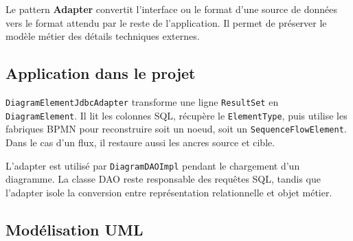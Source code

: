 \documentclass[12pt,a4paper]{article}
\newenvironment{umlfigure}
{\begin{center}\resizebox{0.90\textwidth}{!}\bgroup}
{\egroup\end{center}}
\begin{document}
Le pattern \textbf{Adapter} convertit l'interface ou le format d'une source de données vers le format attendu par le reste de l'application. Il permet de préserver le modèle métier des détails techniques externes.

\subsection{Application dans le projet}

\texttt{DiagramElementJdbcAdapter} transforme une ligne \texttt{ResultSet} en \texttt{DiagramElement}. Il lit les colonnes SQL, récupère le \texttt{ElementType}, puis utilise les fabriques BPMN pour reconstruire soit un noeud, soit un \texttt{SequenceFlowElement}. Dans le cas d'un flux, il restaure aussi les ancres source et cible.

L'adapter est utilisé par \texttt{DiagramDAOImpl} pendant le chargement d'un diagramme. La classe DAO reste responsable des requêtes SQL, tandis que l'adapter isole la conversion entre représentation relationnelle et objet métier.

\subsection{Modélisation UML}

\begin{umlfigure}
\end{umlfigure}
\end{document}
